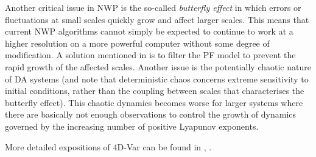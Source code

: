 Another critical issue in NWP is the so-called {\it butterfly effect} in which errors or fluctuations at small scales quickly grow and affect larger scales.  
This means that current NWP algorithms cannot simply be expected to continue to work at a higher resolution on a more powerful computer without some degree of modification.  
A solution mentioned in \cite{lorenc2012} is to filter the PF model to prevent the rapid growth of the affected scales.  
Another issue is the potentially chaotic nature of DA systems (and note that deterministic chaos concerns extreme sensitivity to initial conditions, rather than the coupling between scales that characterises the butterfly effect).  
This chaotic dynamics becomes worse for larger systems where there are basically not enough observations to control the growth of dynamics governed by the increasing number of positive Lyapunov exponents.

More detailed expositions of 4D-Var can be found in \cite{lorenc2012}, \cite{talagrand2012}.
